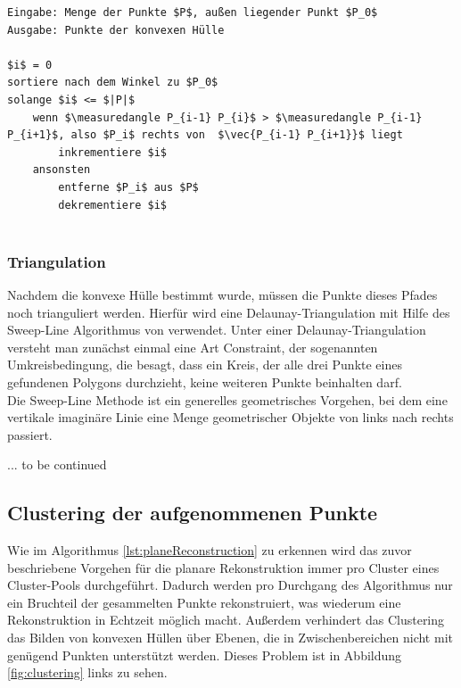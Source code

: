 \begin{lstlisting}[mathescape,caption=Graham Scan Algorithmus, label=lst:graham-scan]
Eingabe: Menge der Punkte $P$, außen liegender Punkt $P_0$
Ausgabe: Punkte der konvexen Hülle

$i$ = 0
sortiere nach dem Winkel zu $P_0$
solange $i$ <= $|P|$
    wenn $\measuredangle P_{i-1} P_{i}$ > $\measuredangle P_{i-1} P_{i+1}$, also $P_i$ rechts von  $\vec{P_{i-1} P_{i+1}}$ liegt
        inkrementiere $i$
    ansonsten
        entferne $P_i$ aus $P$
        dekrementiere $i$
    
\end{lstlisting} 


\subsubsection{Triangulation}

Nachdem die konvexe Hülle bestimmt wurde, müssen die Punkte dieses Pfades noch trianguliert werden. Hierfür wird eine Delaunay-Triangulation mit Hilfe des Sweep-Line Algorithmus von \citet{domiter2008sweep} verwendet. Unter einer Delaunay-Triangulation versteht man zunächst einmal eine Art Constraint, der sogenannten Umkreisbedingung, die besagt, dass ein Kreis, der alle drei Punkte eines gefundenen Polygons durchzieht, keine weiteren Punkte beinhalten darf. \\

Die Sweep-Line Methode ist ein generelles geometrisches Vorgehen, bei dem eine vertikale imaginäre Linie eine Menge geometrischer Objekte von links nach rechts passiert. 

 ... to be continued

\subsection{Clustering der aufgenommenen Punkte}

Wie im Algorithmus \ref{lst:planeReconstruction} zu erkennen wird das zuvor beschriebene Vorgehen für die planare Rekonstruktion immer pro Cluster eines Cluster-Pools durchgeführt. Dadurch werden pro Durchgang des Algorithmus nur ein Bruchteil der gesammelten Punkte rekonstruiert, was wiederum eine Rekonstruktion in Echtzeit möglich macht. Außerdem verhindert das Clustering das Bilden von konvexen Hüllen über Ebenen, die in Zwischenbereichen nicht mit genügend Punkten unterstützt werden. Dieses Problem ist in Abbildung \ref{fig:clustering} links zu sehen.\\

